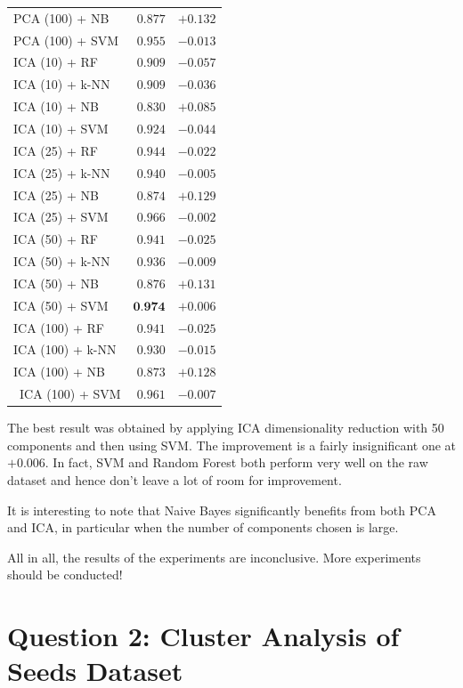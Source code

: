 \documentclass[12pt,article,oneside]{memoir}
\begin{document}
\begin{table}[H]
\begin{minipage}{.5\linewidth}
\begin{tabular}{lrr}
			\hline
			PCA (100) + NB & $0.877$ & $+0.132$ \\ 
			PCA (100) + SVM & $0.955$ & $-0.013$ \\ 
			ICA (10) + RF & $0.909$ & $-0.057$ \\ 
			ICA (10) + k-NN & $0.909$ & $-0.036$ \\ 
			ICA (10) + NB & $0.830$ & $+0.085$ \\ 
			ICA (10) + SVM & $0.924$ & $-0.044$ \\ 
			ICA (25) + RF & $0.944$ & $-0.022$ \\ 
			ICA (25) + k-NN & $0.940$ & $-0.005$ \\ 
			ICA (25) + NB & $0.874$ & $+0.129$ \\ 
			ICA (25) + SVM & $0.966$ & $-0.002$ \\ 
			ICA (50) + RF & $0.941$ & $-0.025$ \\ 
			ICA (50) + k-NN & $0.936$ & $-0.009$ \\ 
			ICA (50) + NB & $0.876$ & $+0.131$ \\ 
			ICA (50) + SVM & $\textbf{0.974}$ & $+0.006$ \\ 
			ICA (100) + RF & $0.941$ & $-0.025$ \\ 
			ICA (100) + k-NN & $0.930$ & $-0.015$ \\ 
			ICA (100) + NB & $0.873$ & $+0.128$ \\\ 
			ICA (100) + SVM & $0.961$ & $-0.007$ \\ 
			\hline
		\end{tabular}
	\end{minipage} 
\end{table}

The best result was obtained by applying ICA dimensionality reduction with 50 components and then using SVM. The improvement is a fairly insignificant one at $+0.006$. In fact, SVM and Random Forest both perform very well on the raw dataset and hence don't leave a lot of room for improvement.

It is interesting to note that Naive Bayes significantly benefits from both PCA and ICA, in particular when the number of components chosen is large.

All in all, the results of the experiments are inconclusive. More experiments should be conducted!

\section{Question 2: Cluster Analysis of Seeds Dataset}
\end{document}
